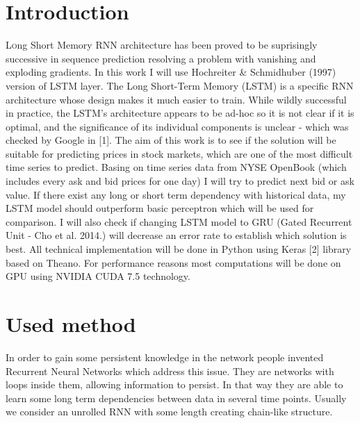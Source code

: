 \documentclass[twoside]{article}
\begin{document}
\begin{multicols}{2} %

\section{Introduction}

\lettrine[nindent=0em,lines=3]{L} ong Short Memory RNN architecture has been proved to be suprisingly successive in sequence prediction
resolving a problem with vanishing and exploding gradients. In this work I will use Hochreiter \& Schmidhuber (1997) version of LSTM layer. 
The Long Short-Term Memory (LSTM) is a specific RNN architecture whose design makes it much easier to train. While wildly successful in practice, the LSTM's architecture appears to be ad-hoc so it is not clear if it is optimal, and the significance of its individual components is unclear - which was checked by Google in [1]. The aim of this work is to see if the solution will be suitable for predicting prices in stock markets, which are one of the most difficult time series to predict.
Basing on time series data from NYSE OpenBook (which includes every ask and bid prices for one day)
I will try to predict next bid or ask value. If there exist any long or short term dependency with historical data, my LSTM model should outperform
basic perceptron which will be used for comparison. I will also check if changing LSTM model to GRU (Gated Recurrent Unit - Cho et al. 2014.) will
decrease an error rate to establish which solution is best.
All technical implementation will be done in Python using Keras [2] library based on Theano. For performance reasons most computations will be done on GPU using NVIDIA CUDA 7.5 technology. 



\section{Used method}

In order to gain some persistent knowledge in the network people invented Recurrent Neural Networks which address this issue.
They are networks with loops inside them, allowing information to persist. In that way they are able to learn some long term dependencies between
data in several time points. Usually we consider an unrolled RNN with some length creating chain-like structure.


\end{multicols}
\end{document}
